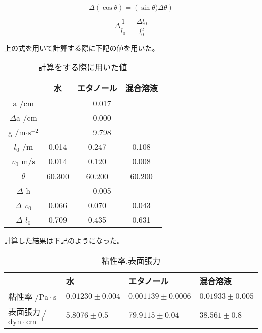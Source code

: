 \documentclass{jsarticle}
\begin{document}
\begin{equation}
    \Delta(\cos{\theta}) = (\sin{\theta)}\Delta\theta)
\end{equation}

\begin{equation}
    \Delta\frac{1}{l_0} = \frac{\Delta l_0}{l_0^2}
\end{equation}

上の式を用いて計算する際に下記の値を用いた。

\begin{table}[H]
\centering
\caption{計算をする際に用いた値}
\label{keisanti1}
\begin{tabular}{|c|c|c|c|}
\hline
                & 水       & エタノール   & 混合溶液   \\ \hline
a /cm           & \multicolumn{3}{c|}{0.017} \\ \hline
$\Delta$a /cm        & \multicolumn{3}{c|}{0.000} \\ \hline
g /m$\cdot \textrm{s}^{-2}$          & \multicolumn{3}{c|}{9.798} \\ \hline
$l_0$ /m           & 0.014   & 0.247   & 0.108  \\ \hline
$v_0$ m/s          & 0.014   & 0.120   & 0.008  \\ \hline
$\theta$   & 60.300  & 60.200  & 60.200 \\ \hline
$\Delta$ h         & \multicolumn{3}{c|}{0.005} \\ \hline
$\Delta$ $v_0$        & 0.066   & 0.070   & 0.043  \\ \hline
$\Delta$ $l_0$        & 0.709   & 0.435   & 0.631  \\ \hline
\end{tabular}
\end{table}

計算した結果は下記のようになった。

\begin{table}[H]
\centering
\caption{粘性率,表面張力}
\label{my-label}
\begin{tabular}{|l|l|l|l|}
\hline
     & 水             & エタノール         & 混合溶液          \\ \hline
粘性率 $/\textrm{Pa}\cdot \textrm{s}$ & $0.01230 \pm 0.004$ & $0.001139 \pm 0.0006$ & $0.01933 \pm 0.005$ \\ \hline
表面張力 /$\textrm{dyn}\cdot \textrm{cm}^{-1}$ & $5.8076 \pm 0.5$ & $79.9115 \pm 0.04$ & $38.561 \pm 0.8$ \\ \hline
\end{tabular}
\end{table}
\end{document}

